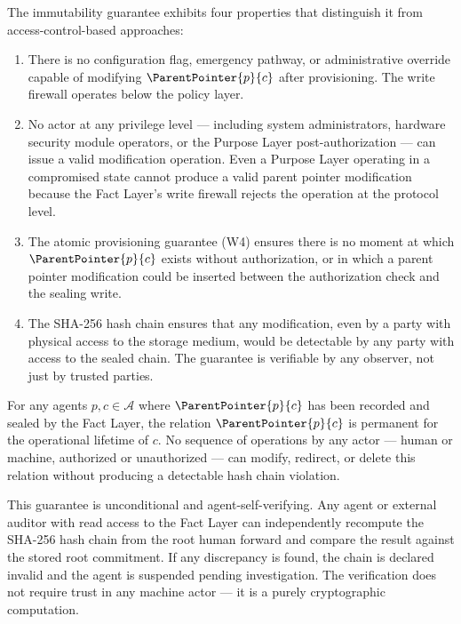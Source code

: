 The immutability guarantee exhibits four properties that distinguish it from access-control-based approaches:

\begin{enumerate}
    \item[(E1) \textbf{No override path.}] There is no configuration flag, emergency pathway, or administrative override capable of modifying $\ParentPointer{p}{c}$ after provisioning. The write firewall operates below the policy layer.

    \item[(E2) \textbf{No privilege elevation.}] No actor at any privilege level — including system administrators, hardware security module operators, or the Purpose Layer post-authorization — can issue a valid modification operation. Even a Purpose Layer operating in a compromised state cannot produce a valid parent pointer modification because the Fact Layer's write firewall rejects the operation at the protocol level.

    \item[(E3) \textbf{No temporal window.}] The atomic provisioning guarantee (W4) ensures there is no moment at which $\ParentPointer{p}{c}$ exists without authorization, or in which a parent pointer modification could be inserted between the authorization check and the sealing write.

    \item[(E4) \textbf{Cryptographic non-repudiation.}] The SHA-256 hash chain ensures that any modification, even by a party with physical access to the storage medium, would be detectable by any party with access to the sealed chain. The guarantee is verifiable by any observer, not just by trusted parties.
\end{enumerate}

\begin{prop}
\label{prop:fact_layer_immutability}
For any agents $p, c \in \mathcal{A}$ where $\ParentPointer{p}{c}$ has been recorded and sealed by the Fact Layer, the relation $\ParentPointer{p}{c}$ is permanent for the operational lifetime of $c$. No sequence of operations by any actor — human or machine, authorized or unauthorized — can modify, redirect, or delete this relation without producing a detectable hash chain violation.
\end{prop}

This guarantee is unconditional and agent-self-verifying. Any agent or external auditor with read access to the Fact Layer can independently recompute the SHA-256 hash chain from the root human forward and compare the result against the stored root commitment. If any discrepancy is found, the chain is declared invalid and the agent is suspended pending investigation. The verification does not require trust in any machine actor — it is a purely cryptographic computation.

